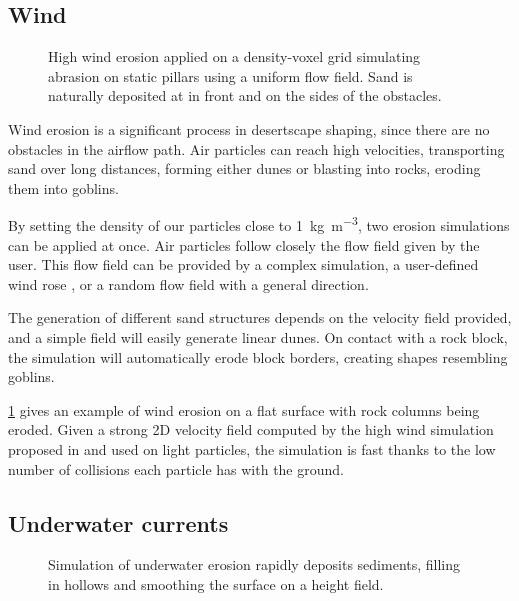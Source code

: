 \subsection{Wind}

\begin{figure}[H]
    \caption[Aeolian erosion simulation]{High wind erosion applied on a density-voxel grid simulating abrasion on static pillars using a uniform flow field. Sand is naturally deposited at in front and on the sides of the obstacles.}
    \label{fig:erosion-results-wind}
\end{figure}

Wind erosion is a significant process in desertscape shaping, since there are no obstacles in the airflow path. Air particles can reach high velocities, transporting sand over long distances, forming either dunes or blasting into rocks, eroding them into goblins. 

By setting the density of our particles close to \SI{1}{\kilogram\per\cubic\meter}, two erosion simulations can be applied at once. Air particles follow closely the flow field given by the user. This flow field can be provided by a complex simulation, a user-defined wind rose \cite{Paris2019b}, or a random flow field with a general direction. 

The generation of different sand structures depends on the velocity field provided, and a simple field will easily generate linear dunes. On contact with a rock block, the simulation will automatically erode block borders, creating shapes resembling goblins. 

\cref{fig:erosion-results-wind} gives an example of wind erosion on a flat surface with rock columns being eroded. Given a strong 2D velocity field computed by the high wind simulation proposed in \cite{Paris2019b} and used on light particles, the simulation is fast thanks to the low number of collisions each particle has with the ground. 

\subsection{Underwater currents}

\begin{figure}[H]
    \caption[Underwater currents simulation]{Simulation of underwater erosion rapidly deposits sediments, filling in hollows and smoothing the surface on a height field.}
    \label{fig:erosion-results-underwater}
\end{figure}

